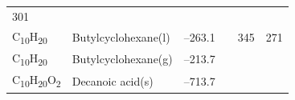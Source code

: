 \documentclass[
  9pt,
]{extbook}
\theoremstyle{definition}
\theoremstyle{definition}
\theoremstyle{definition}
\theoremstyle{remark}
\begin{document}
\begin{longtable}[]{@{}llllll@{}}
\begin{minipage}[t]{0.14\columnwidth}
301\strut
\end{minipage}\tabularnewline
\begin{minipage}[t]{0.07\columnwidth}\raggedright
C\textsubscript{10}H\textsubscript{20}\strut
\end{minipage} & \begin{minipage}[t]{0.17\columnwidth}\raggedright
Butylcyclohexane(l)\strut
\end{minipage} & \begin{minipage}[t]{0.15\columnwidth}\raggedright
--263.1\strut
\end{minipage} & \begin{minipage}[t]{0.15\columnwidth}\raggedright
\strut
\end{minipage} & \begin{minipage}[t]{0.14\columnwidth}\raggedright
345\strut
\end{minipage} & \begin{minipage}[t]{0.14\columnwidth}\raggedright
271\strut
\end{minipage}\tabularnewline
\begin{minipage}[t]{0.07\columnwidth}\raggedright
C\textsubscript{10}H\textsubscript{20}\strut
\end{minipage} & \begin{minipage}[t]{0.17\columnwidth}\raggedright
Butylcyclohexane(g)\strut
\end{minipage} & \begin{minipage}[t]{0.15\columnwidth}\raggedright
--213.7\strut
\end{minipage} & \begin{minipage}[t]{0.15\columnwidth}\raggedright
\strut
\end{minipage} & \begin{minipage}[t]{0.14\columnwidth}\raggedright
\strut
\end{minipage} & \begin{minipage}[t]{0.14\columnwidth}\raggedright
\strut
\end{minipage}\tabularnewline
\begin{minipage}[t]{0.07\columnwidth}\raggedright
C\textsubscript{10}H\textsubscript{20}O\textsubscript{2}\strut
\end{minipage} & \begin{minipage}[t]{0.17\columnwidth}\raggedright
Decanoic acid(s)\strut
\end{minipage} & \begin{minipage}[t]{0.15\columnwidth}\raggedright
--713.7\strut
\end{minipage} & \begin{minipage}[t]{0.15\columnwidth}\raggedright

\end{minipage}
\end{longtable}
\end{document}
